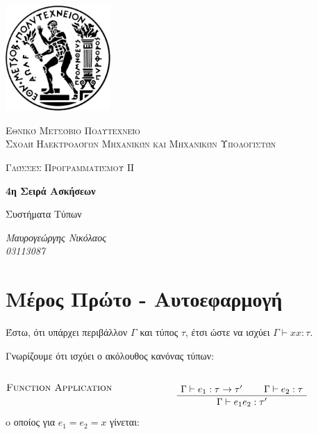 \documentclass[a4paper, 11pt, twoside]{article}
\begin{document}
\begin{titlepage}
	\centering
	\includegraphics[width=0.3\textwidth]{ntua}\par\vspace{1cm}
	{\scshape\LARGE Εθνικό Μετσόβιο Πολυτεχνείο \\ Σχολή Ηλεκτρολόγων 
	Μηχανικών και Μηχανικών Υπολογιστών \par}
	\vspace{1cm}
	{\scshape\Large Γλώσσες Προγραμματισμού ΙΙ\par}
	\vspace{1.5cm}
	{\huge\bfseries 4η Σειρά Ασκήσεων \\ \par}
	\vspace{1cm}
	{\Large Συστήματα Τύπων}
	\vspace{2cm}
	
	{\Large\itshape Μαυρογεώργης Νικόλαος \\ 03113087\par }

	\vspace{2cm}
	\vfill

\end{titlepage}

\section*{Μέρος Πρώτο -  Αυτοεφαρμογή}
Έστω, ότι υπάρχει περιβάλλον $\Gamma$ και τύπος $\tau$, έτσι ώστε να ισχύει $\Gamma \vdash xx : \tau$.

Γνωρίζουμε ότι ισχύει ο ακόλουθος κανόνας τύπων:

\begin{otherlanguage}{english}

\[
\begin{tabular}{@{} l >{\centering\arraybackslash}m{.7\textwidth} @{}}
\textsc{Function Application} &
  \begin{prooftree}
  \AxiomC{$\Gamma \vdash e_1 : \tau \rightarrow \tau '$}
  \AxiomC{$\Gamma \vdash e_2 : \tau $}
  \BinaryInfC{$\Gamma \vdash e_1 e_2: \tau '$}
  \end{prooftree}
\\

\end{tabular}
\]
\end{otherlanguage}
o οποίος για $e_1=e_2=x$ γίνεται:
\end{document}
